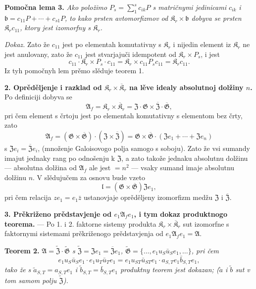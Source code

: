 \documentclass[11pt]{article}
\begin{document}
\noindent\textbf{Pomočna lema 3.} \emph{Ako položimo \(P_s=\sum_1^s c_{ik}P\) s matričnymi jedinicami \(c_{ik}\) i \(\mathfrak b=c_{11}P+\cdots+c_{s1}P\), to kako prsten avtomorfizmov od \(\mathfrak K_r\times\mathfrak b\) dobyva se prsten \(\mathfrak K_rc_{11}\), ktory jest izomorfny s \(\mathfrak K_r\).}

\noindent\emph{Dokaz.} Zato že \(c_{11}\) jest po elementah komutativny s \(\mathfrak K_r\) i nijedin element iz \(\mathfrak K_r\) ne jest anulovany, zato že \(c_{11}\) jest stvarjajuči idempotent od \(\mathfrak K_r\times P_s\), i jest
\[
c_{11}\cdot\mathfrak K_r\times P_s\cdot c_{11}
=\mathfrak K_r\times c_{11}P_sc_{11}
=\mathfrak K_rc_{11}.
\]
Iz tyh pomočnyh lem prěmo slěduje teorem 1.

\noindent\textbf{2. Oprěděljenje i razklad od \(\mathfrak K_r\times\overline{\mathfrak K}_r\) na lěve idealy absolutnoj dolžiny \(n\).} Po definiciji dobyva se
\[
\mathfrak A_f=\mathfrak K_r\times\overline{\mathfrak K}_r
=\mathfrak Z\cdot\mathfrak G\times\overline{\mathfrak Z}\cdot\overline{\mathfrak G},
\]
pri čem element s črtoju jest po elementah komutativny s elementom bez črty, zato
\[
\mathfrak A_f
=(\mathfrak G\times\overline{\mathfrak G})\cdot(\mathfrak Z\times\overline{\mathfrak Z})
=\mathfrak G\times\overline{\mathfrak G}\cdot(\mathfrak Ze_1+\cdots+\mathfrak Ze_n)
\]
s \(\mathfrak Ze_i=\overline{\mathfrak Z}e_i\), (množenje Galoisovogo polja samogo s soboju). Zato že vsi sumandy imajut jednaky rang po odnošenju k \(\mathfrak Z\), a zato takože jednaku absolutnu dolžinu --- absolutna dolžina od \(\mathfrak A_f\) ale jest \(=n^2\) --- vsaky sumand imaje absolutnu dolžinu \(n\). V slědujučem za osnovu bude vzeto
\[
\mathfrak l=(\mathfrak G\times\overline{\mathfrak G})\mathfrak Ze_1,
\]
pri čem relacija \(ze_1=e_1\bar z\) ustanovjaje oprěděljeny izomorfizm medžu \(\mathfrak Z\) i \(\overline{\mathfrak Z}\).

\noindent\textbf{3. Prěkriženo prědstavjenje od \(e_1\mathfrak A_fe_1\), i tym dokaz produktnogo teorema.} --- Po 1. i 2. faktorne sistemy produkta \(\mathfrak K_r\times\overline{\mathfrak K}_r\) sut izomorfne s faktornymi sistemami prěkriženogo prědstavjenja od \(e_1\mathfrak A_fe_1=\mathfrak A\).

\noindent\textbf{Teorem 2.} \emph{\(\mathfrak A=\widetilde{\mathfrak Z}\cdot\widetilde{\mathfrak G}\) s \(\widetilde{\mathfrak Z}=\mathfrak Ze_1=\overline{\mathfrak Z}e_1\), \(\widetilde{\mathfrak G}=\{\ldots,e_1u_S\bar u_Se_1,\ldots\}\), pri čem
\[
e_1u_S\bar u_Se_1\cdot e_1u_T\bar u_Te_1
=e_1u_{ST}\bar u_{ST}e_1\cdot a_{S,T}e_1\bar b_{S,T}e_1,
\]
tako že s \(\tilde a_{S,T}=a_{S,T}e_1\) i \(\tilde b_{S,T}=\bar b_{S,T}e_1\) produktny teorem jest dokazan; (\(\tilde a\) i \(\tilde b\) sut v tom samom polju \(\widetilde{\mathfrak Z}\)).}
\end{document}
